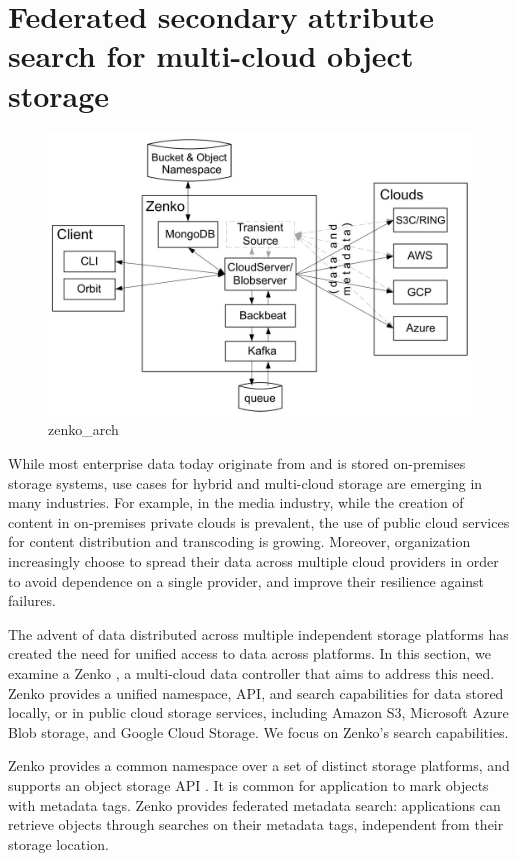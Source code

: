 \section{Federated secondary attribute search for multi-cloud object storage}

\begin{figure}[t]
  \centering
    \includegraphics[scale=0.3]{./figures/case_studies/zenko_arch.jpg}
  \caption{zenko\_arch}
  \label{fig:zenko_architecture}
\end{figure}

While most enterprise data today originate from and is stored on-premises storage systems,
use cases for hybrid and multi-cloud storage are emerging in many industries.
For example, in the media industry, while the creation of content in on-premises private clouds is prevalent,
the use of public cloud services for content distribution and transcoding \cite{scality:bloomberg} is growing.
Moreover, organization increasingly choose to spread their data across multiple cloud providers in order to avoid
dependence on a single provider, and improve their resilience against failures.

The advent of data distributed across multiple independent storage platforms has created the need for unified access to data across platforms.
In this section, we examine a Zenko \cite{zenko:docs}, a multi-cloud data controller that aims to address this need.
Zenko provides a unified namespace, API, and search capabilities for data stored locally,
or in public cloud storage services, including Amazon S3, Microsoft Azure Blob storage, and Google Cloud Storage.
We focus on Zenko's search capabilities.

Zenko provides a common namespace over a set of distinct storage platforms, and supports an object storage API \cite{aws:s3}.
It is common for application to mark objects with metadata tags.
Zenko provides federated metadata search:
applications can retrieve objects through searches on their metadata tags, independent from their storage location.


